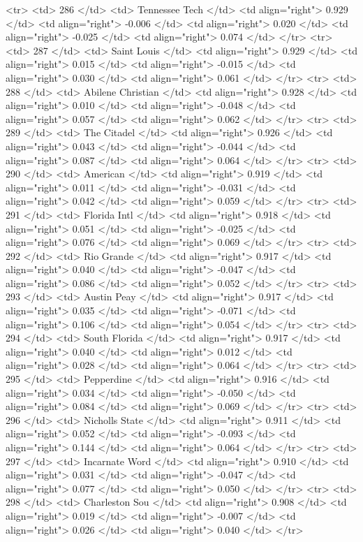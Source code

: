   <tr> <td> 286 </td> <td> Tennessee Tech </td> <td align="right"> 0.929 </td> <td align="right"> -0.006 </td> <td align="right"> 0.020 </td> <td align="right"> -0.025 </td> <td align="right"> 0.074 </td> </tr>
  <tr> <td> 287 </td> <td> Saint Louis </td> <td align="right"> 0.929 </td> <td align="right"> 0.015 </td> <td align="right"> -0.015 </td> <td align="right"> 0.030 </td> <td align="right"> 0.061 </td> </tr>
  <tr> <td> 288 </td> <td> Abilene Christian </td> <td align="right"> 0.928 </td> <td align="right"> 0.010 </td> <td align="right"> -0.048 </td> <td align="right"> 0.057 </td> <td align="right"> 0.062 </td> </tr>
  <tr> <td> 289 </td> <td> The Citadel </td> <td align="right"> 0.926 </td> <td align="right"> 0.043 </td> <td align="right"> -0.044 </td> <td align="right"> 0.087 </td> <td align="right"> 0.064 </td> </tr>
  <tr> <td> 290 </td> <td> American </td> <td align="right"> 0.919 </td> <td align="right"> 0.011 </td> <td align="right"> -0.031 </td> <td align="right"> 0.042 </td> <td align="right"> 0.059 </td> </tr>
  <tr> <td> 291 </td> <td> Florida Intl </td> <td align="right"> 0.918 </td> <td align="right"> 0.051 </td> <td align="right"> -0.025 </td> <td align="right"> 0.076 </td> <td align="right"> 0.069 </td> </tr>
  <tr> <td> 292 </td> <td> Rio Grande </td> <td align="right"> 0.917 </td> <td align="right"> 0.040 </td> <td align="right"> -0.047 </td> <td align="right"> 0.086 </td> <td align="right"> 0.052 </td> </tr>
  <tr> <td> 293 </td> <td> Austin Peay </td> <td align="right"> 0.917 </td> <td align="right"> 0.035 </td> <td align="right"> -0.071 </td> <td align="right"> 0.106 </td> <td align="right"> 0.054 </td> </tr>
  <tr> <td> 294 </td> <td> South Florida </td> <td align="right"> 0.917 </td> <td align="right"> 0.040 </td> <td align="right"> 0.012 </td> <td align="right"> 0.028 </td> <td align="right"> 0.064 </td> </tr>
  <tr> <td> 295 </td> <td> Pepperdine </td> <td align="right"> 0.916 </td> <td align="right"> 0.034 </td> <td align="right"> -0.050 </td> <td align="right"> 0.084 </td> <td align="right"> 0.069 </td> </tr>
  <tr> <td> 296 </td> <td> Nicholls State </td> <td align="right"> 0.911 </td> <td align="right"> 0.052 </td> <td align="right"> -0.093 </td> <td align="right"> 0.144 </td> <td align="right"> 0.064 </td> </tr>
  <tr> <td> 297 </td> <td> Incarnate Word </td> <td align="right"> 0.910 </td> <td align="right"> 0.031 </td> <td align="right"> -0.047 </td> <td align="right"> 0.077 </td> <td align="right"> 0.050 </td> </tr>
  <tr> <td> 298 </td> <td> Charleston Sou </td> <td align="right"> 0.908 </td> <td align="right"> 0.019 </td> <td align="right"> -0.007 </td> <td align="right"> 0.026 </td> <td align="right"> 0.040 </td> </tr>
